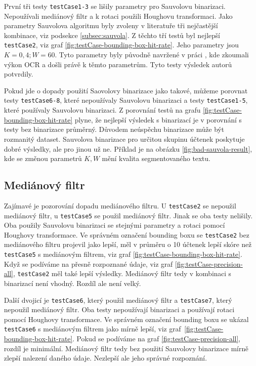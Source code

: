 \documentclass[thesis=B,czech]{FITthesis}[2019/12/23]
\def\myit#1{\texttt{#1}}
\begin{document}
 První tři testy \myit{testCase1-3} se lišily parametry pro Sauvolovu binarizaci. Nepoužívali mediánový filtr a k rotaci použili Houghovu transformaci. Jako parametry Sauvolova algoritmu byly zvoleny v literatuře tři nejčastější kombinace, viz podsekce \ref{subsec:sauvola}. Z těchto tří testů byl nejlepší \myit{testCase2}, viz graf \ref{fig:testCase-bounding-box-hit-rate}. Jeho parametry jsou $K=0,4; W=60$. Tyto parametry byly původně navržené v práci \cite{rangoniOCRBasedThresholding2009}, kde zkoumali výkon OCR a došli právě k těmto parametrům. Tyto testy výsledek autorů potvrdily.

 Pokud jde o dopady použití Saovolovy binarizace jako takové, můžeme porovnat testy \myit{testCase6-8}, které nepoužívaly Sauvolovu binarizaci a testy \myit{testCase1-5}, které používaly Sauvolovu binarizaci. Z porovnání testů na grafu \ref{fig:testCase-bounding-box-hit-rate} plyne, že nejlepší výsledek s binarizací je v porovnání s testy bez binarizace průměrný. Důvodem neúspěchu binarizace může být rozmanitý dataset. Sauvolova binarizace pro určitou skupinu účtenek poskytuje dobré výsledky, ale pro jinou už ne. Příklad je na obrázku \ref{fig:bad-sauvola-result}, kde se změnou parametrů $K, W$ mění kvalita segmentovaného textu.

 \subsection{Mediánový filtr}
  \label{subsec:median-results}
 Zajímavé je pozorování dopadu mediánového filtru. U \myit{testCase2} se nepoužil mediánový filtr, u \myit{testCase5} se použil mediánový filtr. Jinak se oba testy nelišily. Oba použily Sauvolovu binarizaci se stejnými parametry a rotaci pomocí Houghovy transformace. Ve správném označení bounding boxu se \myit{testCase2} bez mediánového filtru projevil jako lepší, měl v průměru o 10 účtenek lepší skóre než \myit{testCase5} s mediánovým filtrem, viz graf \ref{fig:testCase-bounding-box-hit-rate}. Když se podíváme na přesně rozpoznané údaje, viz graf \ref{fig:testCase-precision-all}, \myit{testCase2} měl také lepší výsledky. Mediánový filtr tedy v kombinaci s binarizací není vhodný. Rozdíl ale není velký.

 Další dvojicí je \myit{testCase6}, který použil mediánový filtr a \myit{testCase7}, který nepoužil mediánový filtr. Oba testy nepoužívají binarizaci a používají rotaci pomocí Houghovy transformace. Ve správném označení bounding boxu se ukázal \myit{testCase6} s mediánovým filtrem jako mírně lepší, viz graf~\ref{fig:testCase-bounding-box-hit-rate}. Pokud se podíváme na graf \ref{fig:testCase-precision-all}, rozdíl je minimální. Mediánový filtr tedy bez použití Sauvolovy binarizace mírně zlepší nalezení daného údaje. Nezlepší ale jeho správné rozpoznání.
\end{document}
